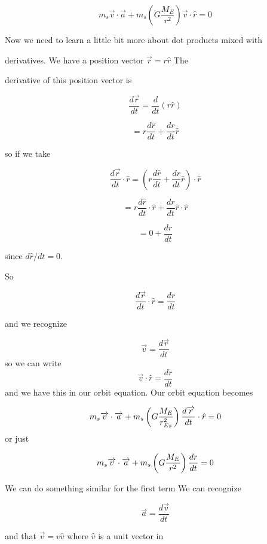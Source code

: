 $$m_{s}\overrightarrow{v}\cdot \overrightarrow{a}+m_{s}\left( G\frac{M_{E}}{r^{2}}\right) \overrightarrow{v}\cdot \hat{r}=0 $$

Now we need to learn a little bit more about dot products mixed with

derivatives. We have a position vector $\overrightarrow{r}=r\hat{r}$ The

derivative of this position vector is 

$$\frac{d\overrightarrow{r}}{dt}=\frac{d}{dt}\left( r\hat{r}\right) $$

$$=r\frac{d\hat{r}}{dt}+\frac{dr}{dt}\hat{r}$$


so if we take 

$$\frac{d\overrightarrow{r}}{dt}\cdot \hat{r}=\left( r\frac{d\hat{r}}{dt}+\frac{dr}{dt}\hat{r}\right) \cdot \hat{r}$$


$$=r\frac{d\hat{r}}{dt}\cdot \hat{r}+\frac{dr}{dt}\hat{r}\cdot \hat{r}$$%

$$=0+\frac{dr}{dt}$$%

since $d\hat{r}/dt=0.$


So 

$$\frac{d\overrightarrow{r}}{dt}\cdot \hat{r}=\frac{dr}{dt}$$

and we recognize 

\begin{equation*}
	\overrightarrow{v}=\frac{d\overrightarrow{r}}{dt}
\end{equation*}%
so we can write 
\begin{equation}
	\overrightarrow{v}\cdot \hat{r}=\frac{dr}{dt}  \label{vdotrhat}
\end{equation}%
and we have this in our orbit equation. Our orbit equation becomes

\begin{equation*}
	m_{s}\overrightarrow{v}\cdot \overrightarrow{a}+m_{s}\left( G\frac{M_{E}}{%
		r_{Es}^{2}}\right) \frac{d\overrightarrow{r}}{dt}\cdot \hat{r}=0
\end{equation*}%
or just

\begin{equation*}
	m_{s}\overrightarrow{v}\cdot \overrightarrow{a}+m_{s}\left( G\frac{M_{E}}{%
		r^{2}}\right) \frac{dr}{dt}=0
\end{equation*}

We can do something similar for the first term We can recognize 

$$\overrightarrow{a}=\frac{d\overrightarrow{v}}{dt}$$

and that $\overrightarrow{v}=v\hat{v}$ where $\hat{v}$ is a unit vector in

